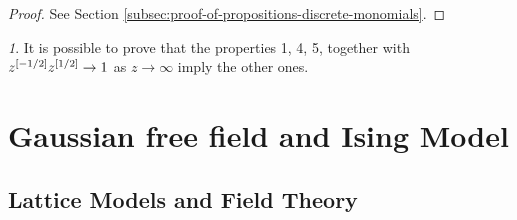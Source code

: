 \documentclass[12pt,oneside,english]{amsart}
\numberwithin{equation}{section}
\numberwithin{figure}{section}
\theoremstyle{plain}
\theoremstyle{plain}
\theoremstyle{plain}
\theoremstyle{plain}
\theoremstyle{remark}
\newtheorem{rem}[thm]{\protect\remarkname}
\theoremstyle{definition}
\theoremstyle{plain}
\theoremstyle{plain}
\numberwithin{thm}{section}
\newcommand{\kallemod}[1]{{\color{kallecol} {#1}}}
\providecommand{\remarkname}{Remark}
\providecommand{\remarkname}{Remark}
\providecommand{\remarkname}{Remark}
\providecommand{\remarkname}{Remark}
\begin{document}
\begin{proof}
See Section \ref{subsec:proof-of-propositions-discrete-monomials}. 
\end{proof}
\begin{rem}
It is possible to prove that the properties 1, 4, 5, together with
${z^{[{-1/2}]}} {z^{[{1/2}]}} \to 1$ as $z \to \infty$
imply the other ones. 
\end{rem}


\section{\label{sec:gaussian-free-field-and-ising-model}Gaussian free field
and Ising Model}

\subsection{\label{subsec:lattice-models-and-field-theory}Lattice Models and
Field Theory}

\end{document}
